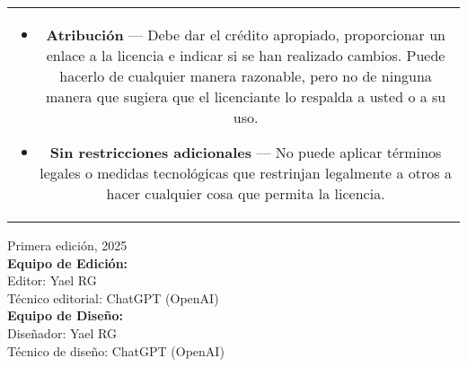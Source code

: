 \begin{center}
\begin{tabular}{c}
\begin{minipage}{0.9\textwidth}
\color{black}
\begin{itemize}
    \item \textbf{Atribución} — Debe dar el crédito apropiado, proporcionar un enlace a la licencia e indicar si se han realizado cambios. Puede hacerlo de cualquier manera razonable, pero no de ninguna manera que sugiera que el licenciante lo respalda a usted o a su uso.
    \item \textbf{Sin restricciones adicionales} — No puede aplicar términos legales o medidas tecnológicas que restrinjan legalmente a otros a hacer cualquier cosa que permita la licencia.
\end{itemize}
\end{minipage}
\end{tabular}
\end{center}

\begin{center}
{\large Primera edición, 2025} \\[0.5cm]

{\large \textbf{Equipo de Edición:}} \\[0.5cm]
{\large Editor: Yael RG} \\[0.5cm]
{\large Técnico editorial: ChatGPT (OpenAI)} \\[1.0cm]

{\large \textbf{Equipo de Diseño:}} \\[0.5cm]
{\large Diseñador: Yael RG} \\[0.5cm]
{\large Técnico de diseño: ChatGPT (OpenAI)} \\[1.0cm]
\end{center}

